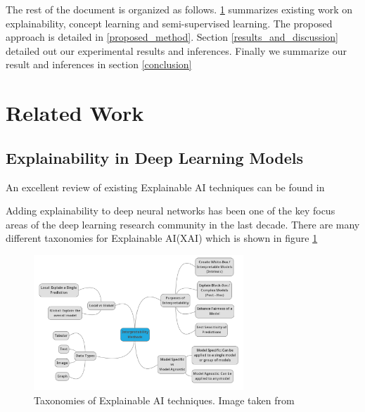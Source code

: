 \documentclass{JMLFS}
\begin{document}
The rest of the document is organized as follows. \ref{related_work} summarizes existing work on explainability, concept learning and semi-supervised learning.
The proposed approach is detailed in \ref{proposed_method}. Section \ref{results_and_discussion} detailed out our experimental results and inferences.
Finally we summarize our result and inferences in section \ref{conclusion}


\section{Related Work}\label{related_work}

\subsection{Explainability in Deep Learning Models}\label{lit_survey_explainability}

An excellent review of existing Explainable AI techniques can be found in \cite{linardatos2021}

Adding explainability to deep neural networks has been one of the key focus areas of the deep learning research community in the last decade.
There are many different taxonomies for Explainable AI(XAI) which is shown in figure \ref{f:explainability_taxonomies}
\begin{figure}
\centering
\includegraphics[height=2in]{images/explainability_taxonomies.png}
\caption{Taxonomies of Explainable AI techniques. Image taken from \cite{linardatos2021}}
\label{f:explainability_taxonomies}
\end{figure}
\end{document}
